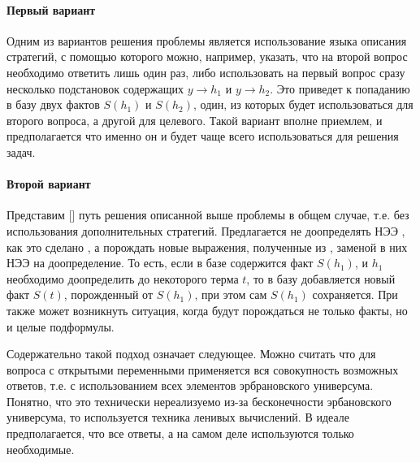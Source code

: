 \paragraph{Первый вариант}
Одним из вариантов решения проблемы является использование языка описания стратегий, с помощью которого можно, например, указать, что на второй вопрос необходимо ответить лишь один раз, либо использовать на первый вопрос сразу несколько подстановок содержащих $y\rightarrow h_1$ и $y\rightarrow h_2$. Это приведет к попаданию в базу двух фактов $S(h_1)$ и $S(h_2)$, один, из которых будет использоваться для второго вопроса, а другой для целевого. Такой вариант вполне приемлем, и предполагается что именно он и будет чаще всего использоваться для решения задач.  

\paragraph{Второй вариант}
Представим [] путь решения описанной выше проблемы  в общем случае, т.е. без использования дополнительных стратегий. Предлагается не доопределять НЭЭ , как это сделано , а порождать новые выражения, полученные из , заменой в них НЭЭ на доопределение. То есть, если в базе содержится факт $S(h_1)$, и $h_1$ необходимо доопределить до некоторого терма $t$, то в базу добавляется новый факт $S(t)$, порожденный от $S(h_1)$, при этом сам $S(h_1)$ сохраняется. При  также может возникнуть ситуация, когда будут порождаться не только факты, но и целые подформулы.

Содержательно такой подход означает следующее. Можно считать что для вопроса с открытыми переменными применяется вся совокупность возможных ответов, т.е. с использованием всех элементов эрбрановского универсума. Понятно, что это технически нереализуемо из-за бесконечности эрбановского универсума, то используется техника ленивых вычислений. В идеале предполагается, что  все ответы, а на самом деле используются только необходимые.


